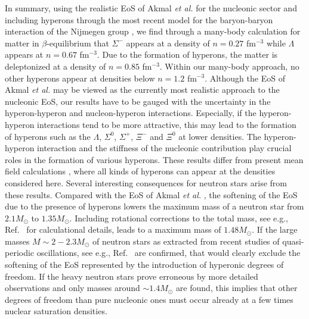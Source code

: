 \begin{multicols}{2}
In summary, using the realistic EoS of Akmal {\em et al.} \cite{apr98} for the 
nucleonic sector and including hyperons through the most recent model for the 
baryon-baryon interaction of the Nijmegen group \cite{sr99}, we find 
through a many-body calculation for matter in $\beta$-equilibrium that
$\Sigma^-$ appears at a density of $n=0.27$ fm$^{-3}$ while 
$\Lambda$ appears at $n=0.67$ fm$^{-3}$. 
Due to the formation
of hyperons, the matter is deleptonized 
at a density of $n=0.85$ fm$^{-3}$. Within our many-body approach,
no other hyperons appear at densities below $n=1.2$ fm$^{-3}$.  
Although the EoS of Akmal {\em et al.} \cite{apr98} may be viewed as the currently 
most realistic approach to the nucleonic EoS, our
results have to be gauged with the uncertainty in the hyperon-hyperon and nucleon-hyperon
interactions. Especially, if the hyperon-hyperon interactions tend to be 
more attractive, this may lead to the formation of hyperons such as the $\Lambda$, 
$\Sigma^0$, $\Sigma^+$, $\Xi^-$ and $\Xi^0$ at lower densities.
The hyperon-hyperon interaction and the stiffness of the nucleonic contribution
play crucial roles in the formation of various hyperons. These results differ 
from present mean field calculations \cite{glendenning92,prakash97,pke95,ms96},
where all kinds of hyperons can appear at the densities considered here.
Several interesting consequences for neutron stars arise from these results. 
Compared with the EoS of Akmal {\em et al.} \cite{apr98}, the softening
of the EoS due to the presence of hyperons lowers the maximum mass of a neutron 
star from $2.1M_{\odot}$ to $1.35M_{\odot}$. Including rotational corrections to the 
total mass, see e.g., Ref.\ \cite{hh99,hartle67} for calculational details, 
leads to a maximum mass of  $1.48M_{\odot}$. If the large masses $M\sim 2-2.3M_{\odot}$
of neutron stars as extracted
from recent studies of quasi-periodic oscillations, see e.g., Ref.\ \cite{Lamb}
are confirmed, that would clearly exclude the softening of the EoS represented
by the introduction of hyperonic degrees of freedom.  
If the heavy neutron stars prove erroneous by more detailed observations
and only masses around $\sim 1.4M_\odot$ \cite{thorsett} are found, 
this implies that other degrees of freedom than pure nucleonic ones 
must occur already at a few times nuclear
saturation densities. 


\end{multicols}
